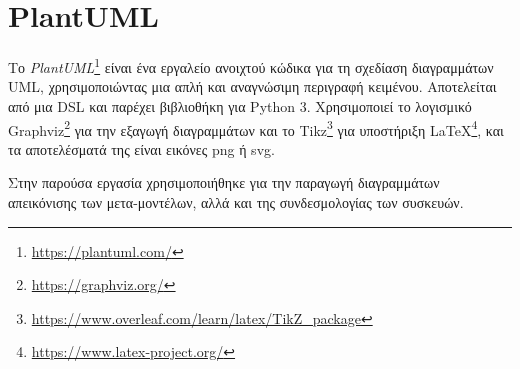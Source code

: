 \section{PlantUML}
\label{sec:plantuml}

Το \textit{PlantUML}\footnote{\url{https://plantuml.com/}} είναι ένα εργαλείο ανοιχτού κώδικα για τη σχεδίαση διαγραμμάτων UML, χρησιμοποιώντας μια απλή και αναγνώσιμη περιγραφή κειμένου. Αποτελείται από μια DSL και παρέχει βιβλιοθήκη για Python 3. Χρησιμοποιεί το λογισμικό Graphviz\footnote{\url{https://graphviz.org/}} για την εξαγωγή διαγραμμάτων και το Tikz\footnote{\url{https://www.overleaf.com/learn/latex/TikZ_package}} για υποστήριξη LaTeX\footnote{\url{https://www.latex-project.org/}}, και τα αποτελέσματά της είναι εικόνες png ή svg.

Στην παρούσα εργασία χρησιμοποιήθηκε για την παραγωγή διαγραμμάτων απεικόνισης των μετα-μοντέλων, αλλά και της συνδεσμολογίας των συσκευών.